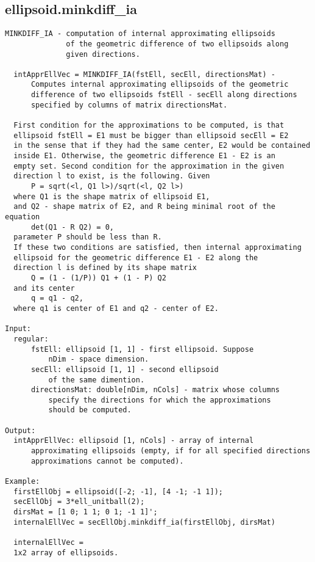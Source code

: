 \subsection{\texorpdfstring{ellipsoid.minkdiff\_ia}{minkdiff\_ia}}\label{method:ellipsoid.minkdiffia}
\begin{verbatim}
MINKDIFF_IA - computation of internal approximating ellipsoids
              of the geometric difference of two ellipsoids along
              given directions.

  intApprEllVec = MINKDIFF_IA(fstEll, secEll, directionsMat) -
      Computes internal approximating ellipsoids of the geometric
      difference of two ellipsoids fstEll - secEll along directions
      specified by columns of matrix directionsMat.

  First condition for the approximations to be computed, is that
  ellipsoid fstEll = E1 must be bigger than ellipsoid secEll = E2
  in the sense that if they had the same center, E2 would be contained
  inside E1. Otherwise, the geometric difference E1 - E2 is an
  empty set. Second condition for the approximation in the given
  direction l to exist, is the following. Given
      P = sqrt(<l, Q1 l>)/sqrt(<l, Q2 l>)
  where Q1 is the shape matrix of ellipsoid E1,
  and Q2 - shape matrix of E2, and R being minimal root of the equation
      det(Q1 - R Q2) = 0,
  parameter P should be less than R.
  If these two conditions are satisfied, then internal approximating
  ellipsoid for the geometric difference E1 - E2 along the
  direction l is defined by its shape matrix
      Q = (1 - (1/P)) Q1 + (1 - P) Q2
  and its center
      q = q1 - q2,
  where q1 is center of E1 and q2 - center of E2.

Input:
  regular:
      fstEll: ellipsoid [1, 1] - first ellipsoid. Suppose
          nDim - space dimension.
      secEll: ellipsoid [1, 1] - second ellipsoid
          of the same dimention.
      directionsMat: double[nDim, nCols] - matrix whose columns
          specify the directions for which the approximations
          should be computed.

Output:
  intApprEllVec: ellipsoid [1, nCols] - array of internal
      approximating ellipsoids (empty, if for all specified directions
      approximations cannot be computed).

Example:
  firstEllObj = ellipsoid([-2; -1], [4 -1; -1 1]);
  secEllObj = 3*ell_unitball(2);
  dirsMat = [1 0; 1 1; 0 1; -1 1]';
  internalEllVec = secEllObj.minkdiff_ia(firstEllObj, dirsMat)

  internalEllVec =
  1x2 array of ellipsoids.
\end{verbatim}
